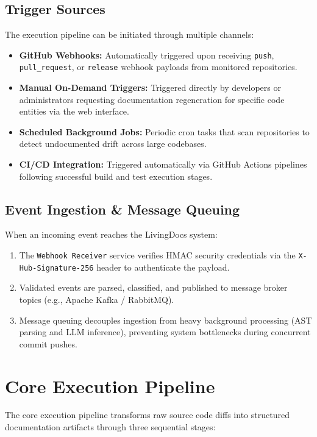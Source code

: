 \subsection{Trigger Sources}
The execution pipeline can be initiated through multiple channels:
\begin{itemize}
    \item \textbf{GitHub Webhooks:} Automatically triggered upon receiving \texttt{push}, \texttt{pull\_request}, or \texttt{release} webhook payloads from monitored repositories.
    \item \textbf{Manual On-Demand Triggers:} Triggered directly by developers or administrators requesting documentation regeneration for specific code entities via the web interface.
    \item \textbf{Scheduled Background Jobs:} Periodic cron tasks that scan repositories to detect undocumented drift across large codebases.
    \item \textbf{CI/CD Integration:} Triggered automatically via GitHub Actions pipelines following successful build and test execution stages.
\end{itemize}

\subsection{Event Ingestion \& Message Queuing}
When an incoming event reaches the LivingDocs system:
\begin{enumerate}
    \item The \texttt{Webhook Receiver} service verifies HMAC security credentials via the \texttt{X-Hub-Signature-256} header to authenticate the payload.
    \item Validated events are parsed, classified, and published to message broker topics (e.g., Apache Kafka / RabbitMQ).
    \item Message queuing decouples ingestion from heavy background processing (AST parsing and LLM inference), preventing system bottlenecks during concurrent commit pushes.
\end{enumerate}

\section{Core Execution Pipeline}

The core execution pipeline transforms raw source code diffs into structured documentation artifacts through three sequential stages:

